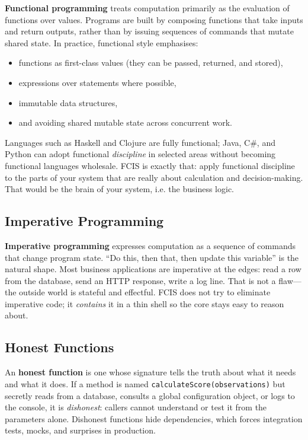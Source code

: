 \textbf{Functional programming} treats computation primarily as the evaluation of functions over values. Programs are built by composing functions that take inputs and return outputs, rather than by issuing sequences of commands that mutate shared state. In practice, functional style emphasises:
\begin{itemize}
    \item functions as first-class values (they can be passed, returned, and stored),
    \item expressions over statements where possible,
    \item immutable data structures,
    \item and avoiding shared mutable state across concurrent work.
\end{itemize}
Languages such as Haskell and Clojure are fully functional; Java, C\#, and Python can adopt functional \textit{discipline} in selected areas without becoming functional languages wholesale. FCIS is exactly that: apply functional discipline to the parts of your system that are really about calculation and decision-making. That would be the brain of your system, i.e. the business logic.

\subsection{Imperative Programming}
\label{sec:fcis_imperative_programming}

\textbf{Imperative programming} expresses computation as a sequence of commands that change program state. ``Do this, then that, then update this variable'' is the natural shape. Most business applications are imperative at the edges: read a row from the database, send an HTTP response, write a log line. That is not a flaw---the outside world is stateful and effectful. FCIS does not try to eliminate imperative code; it \textit{contains} it in a thin shell so the core stays easy to reason about.

\subsection{Honest Functions}
\label{sec:fcis_honest_functions}

An \textbf{honest function} is one whose signature tells the truth about what it needs and what it does.\autocite{seemannFcis} If a method is named \texttt{calculateScore(observations)} but secretly reads from a database, consults a global configuration object, or logs to the console, it is \textit{dishonest}: callers cannot understand or test it from the parameters alone. Dishonest functions hide dependencies, which forces integration tests, mocks, and surprises in production.

